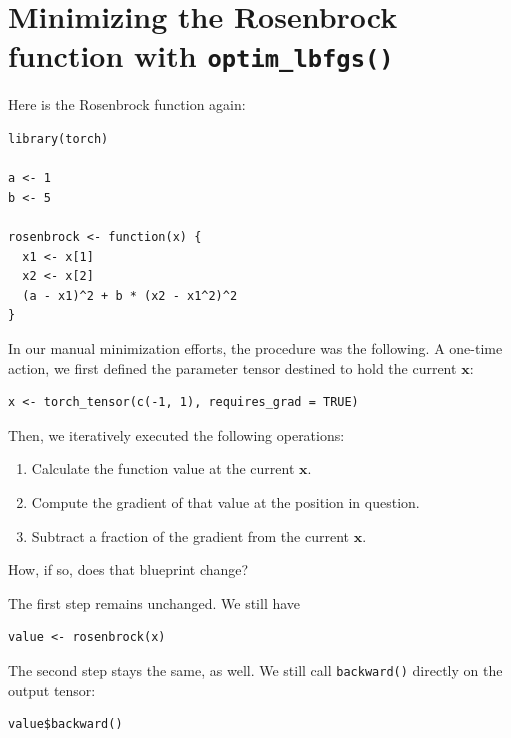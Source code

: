 \documentclass[
  letterpaper,
]{krantz}
\begin{document}
\hypertarget{minimizing-the-rosenbrock-function-with-optim_lbfgs}{%
\section{\texorpdfstring{Minimizing the Rosenbrock function with
\texttt{optim\_lbfgs()}}{Minimizing the Rosenbrock function with optim\_lbfgs()}}\label{minimizing-the-rosenbrock-function-with-optim_lbfgs}}

Here is the Rosenbrock function again:

\begin{verbatim}
library(torch)

a <- 1
b <- 5

rosenbrock <- function(x) {
  x1 <- x[1]
  x2 <- x[2]
  (a - x1)^2 + b * (x2 - x1^2)^2
}
\end{verbatim}

In our manual minimization efforts, the procedure was the following. A
one-time action, we first defined the parameter tensor destined to hold
the current \(\mathbf{x}\):

\begin{verbatim}
x <- torch_tensor(c(-1, 1), requires_grad = TRUE)
\end{verbatim}

Then, we iteratively executed the following operations:

\begin{enumerate}
\def\labelenumi{\arabic{enumi}.}
\item
  Calculate the function value at the current \(\mathbf{x}\).
\item
  Compute the gradient of that value at the position in question.
\item
  Subtract a fraction of the gradient from the current \(\mathbf{x}\).
\end{enumerate}

How, if so, does that blueprint change?

The first step remains unchanged. We still have

\begin{verbatim}
value <- rosenbrock(x)
\end{verbatim}

The second step stays the same, as well. We still call
\texttt{backward()} directly on the output tensor:

\begin{verbatim}
value$backward()
\end{verbatim}
\end{document}
